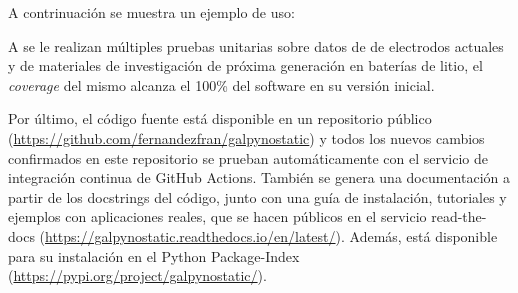 A contrinuación se muestra un ejemplo de uso:



A  se le realizan múltiples pruebas unitarias sobre datos de
de electrodos actuales y de materiales de investigación de próxima generación en 
baterías de litio, el \textit{coverage} del mismo alcanza el 100\% del software
en su versión inicial.

Por último, el código fuente está disponible en un repositorio público 
(\url{https://github.com/fernandezfran/galpynostatic}) y todos los nuevos cambios 
confirmados en este repositorio se prueban automáticamente con el servicio de 
integración continua de GitHub Actions. También se genera una documentación a 
partir de los docstrings del código, junto con una guía de instalación,
tutoriales y ejemplos con aplicaciones reales, que se hacen públicos en el 
servicio read-the-docs (\url{https://galpynostatic.readthedocs.io/en/latest/}). 
Además,  está disponible para su instalación en el Python 
Package-Index (\url{https://pypi.org/project/galpynostatic/}).
